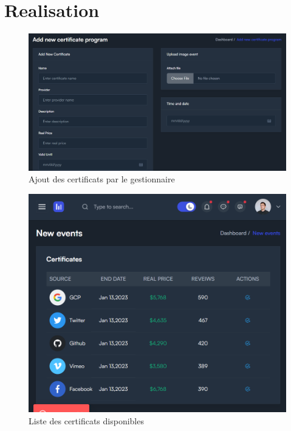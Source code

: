 \documentclass[a4paper, 11pt, openany]{report}
\begin{document}
\section{Realisation}
\begin{figure}
\centering
\includegraphics[width=\textwidth]{assets/images/admin-add-certif.png} 
\caption{Ajout des certificats par le gestionnaire}
\label{fig:Ajout_des_certificats}
\end{figure}


\begin{figure}
\centering
\includegraphics[width=\textwidth]{assets/images/certifs-list.png} 
\caption{Liste des certificats disponibles}
\label{fig:certificates}
\end{figure}
\end{document}
